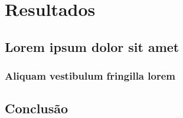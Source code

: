 \documentclass[12pt,openright,twoside,a4paper,english,french,spanish,brazil]{abntex2}
\begin{document}






\part{Resultados}

\chapter{Lorem ipsum dolor sit amet}

\section{Aliquam vestibulum fringilla lorem}

\lipsum[1]

\lipsum[2-3]

% 

\chapter*[Conclusão]{Conclusão}

\lipsum[31-33]

\postextual



%
%

\end{document}
